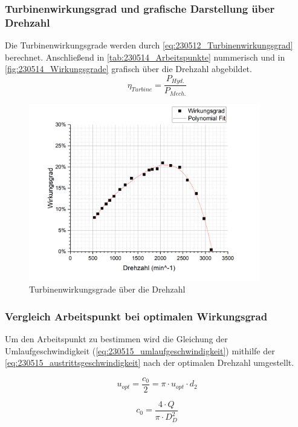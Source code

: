 \subsubsection{Turbinenwirkungsgrad und grafische Darstellung über Drehzahl}
Die Turbinenwirkungsgrade werden durch \autoref{eq:230512_Turbinenwirkungsgrad} berechnet. Anschließend in \autoref{tab:230514_Arbeitspunkte} nummerisch und in \autoref{fig:230514_Wirkungsgrade} grafisch über die Drehzahl abgebildet. 
\begin{equation}
  \eta_{Turbine} = \frac{P_{Hyd.}}{P_{Mech.}}
  \label{eq:230512_Turbinenwirkungsgrad}
\end{equation}
\begin{figure}[H]
  \centering
  \includegraphics[width=0.9\textwidth]{Abbildungen/Wirkungsgrade.png}
  \caption{Turbinenwirkungsgrade über die Drehzahl}
  \label{fig:230514_Wirkungsgrade}
\end{figure}
\subsubsection{Vergleich Arbeitspunkt bei optimalen Wirkungsgrad}

Um den Arbeitspunkt zu bestimmen wird die Gleichung der Umlaufgeschwindigkeit (\autoref{eq:230515_umlaufgeschwindigkeit}) mithilfe der \autoref{eq:230515_austrittsgeschwindigkeit} nach der optimalen Drehzahl umgestellt.

\begin{equation}
  u_{opt} = \frac{c_{0}}{2}=\pi \cdot u_{opt} \cdot d_{2}
  \label{eq:230515_umlaufgeschwindigkeit}
\end{equation}


\begin{equation}
c_{0}=\frac{4 \cdot Q}{\pi \cdot D_{D}^2}
  \label{eq:230515_austrittsgeschwindigkeit}
\end{equation}

